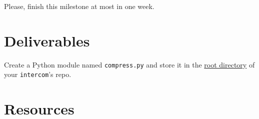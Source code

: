 Please, finish this milestone at most in one week.

\section{Deliverables}

Create a Python module named \texttt{compress.py} and store it in the
\href{https://github.com/Tecnologias-multimedia/intercom}{root
  directory} of your \texttt{intercom}'s repo.

\section{Resources}


